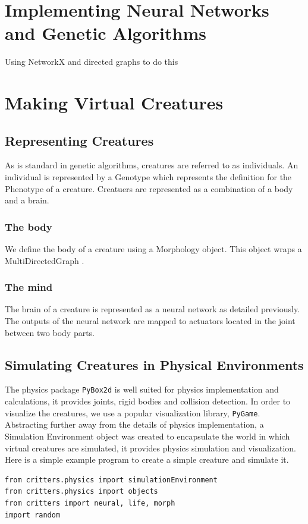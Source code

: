 \documentclass[12pt]{article}
\begin{document}
\section{Implementing Neural Networks and Genetic Algorithms}

Using NetworkX and directed graphs to do this


\section{Making Virtual Creatures}

\subsection{Representing Creatures}
As is standard in genetic algorithms, creatures are referred to as individuals. An individual is represented by a Genotype which represents the definition for the Phenotype of a creature. Creatuers are represented as a combination of a body and a brain. 

\subsubsection{The body}
We define the body of a creature using a Morphology object. This object wraps a MultiDirectedGraph .  

\subsubsection{The mind}
The brain of a creature is represented as a neural network as detailed previously.  The outputs of the neural network are mapped to actuators located in the joint between two body parts. 

\subsection{Simulating Creatures in Physical Environments}
The physics package \verb|PyBox2d| is well suited for physics implementation and calculations, it provides joints, rigid bodies and collision detection. In order to visualize the creatures, we use a popular visualization library, \verb|PyGame|. Abstracting further away from the details of physics implementation, a Simulation Environment object was created to encapsulate the world in which virtual creatures are simulated, it provides physics simulation and visualization.
Here is a simple example program to create a simple creature and simulate it.
\begin{verbatim}
from critters.physics import simulationEnvironment
from critters.physics import objects
from critters import neural, life, morph
import random
\end{verbatim}
\end{document}

